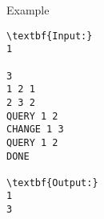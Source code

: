 Example
\begin{verbatim}
\textbf{Input:}
1

3
1 2 1
2 3 2
QUERY 1 2
CHANGE 1 3
QUERY 1 2
DONE

\textbf{Output:}
1
3
\end{verbatim}